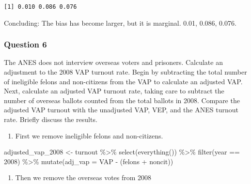 \documentclass[
  letterpaper,
  DIV=11,
  numbers=noendperiod]{scrartcl}
\newenvironment{Shaded}{\begin{snugshade}}{\end{snugshade}}
\newcommand{\AttributeTok}[1]{\textcolor[rgb]{0.40,0.45,0.13}{#1}}
\newcommand{\DecValTok}[1]{\textcolor[rgb]{0.68,0.00,0.00}{#1}}
\newcommand{\FunctionTok}[1]{\textcolor[rgb]{0.28,0.35,0.67}{#1}}
\newcommand{\NormalTok}[1]{\textcolor[rgb]{0.00,0.23,0.31}{#1}}
\newcommand{\OtherTok}[1]{\textcolor[rgb]{0.00,0.23,0.31}{#1}}
\newcommand{\SpecialCharTok}[1]{\textcolor[rgb]{0.37,0.37,0.37}{#1}}
\providecommand{\tightlist}{%
  \setlength{\itemsep}{0pt}\setlength{\parskip}{0pt}}\usepackage{longtable,booktabs,array}
\begin{document}
\begin{verbatim}
[1] 0.010 0.086 0.076
\end{verbatim}

Concluding: The bias has become larger, but it is marginal. 0.01, 0.086,
0.076.

\subsubsection{Question 6}\label{question-6}

The ANES does not interview overseas voters and prisoners. Calculate an
adjustment to the 2008 VAP turnout rate. Begin by subtracting the total
number of ineligible felons and non-citizens from the VAP to calculate
an adjusted VAP. Next, calculate an adjusted VAP turnout rate, taking
care to subtract the number of overseas ballots counted from the total
ballots in 2008. Compare the adjusted VAP turnout with the unadjusted
VAP, VEP, and the ANES turnout rate. Briefly discuss the results.

\begin{enumerate}
\def\labelenumi{\arabic{enumi}.}
\tightlist
\item
  First we remove ineligible felons and non-citizens.
\end{enumerate}

\begin{Shaded}
\begin{Highlighting}[]
\NormalTok{adjusted\_vap\_2008 }\OtherTok{\textless{}{-}}\NormalTok{ turnout }\SpecialCharTok{\%\textgreater{}\%} 
  \FunctionTok{select}\NormalTok{(}\FunctionTok{everything}\NormalTok{()) }\SpecialCharTok{\%\textgreater{}\%} 
  \FunctionTok{filter}\NormalTok{(year }\SpecialCharTok{==} \DecValTok{2008}\NormalTok{) }\SpecialCharTok{\%\textgreater{}\%} 
  \FunctionTok{mutate}\NormalTok{(}\AttributeTok{adj\_vap =}\NormalTok{ VAP }\SpecialCharTok{{-}}\NormalTok{ (felons }\SpecialCharTok{+}\NormalTok{ noncit))}
\end{Highlighting}
\end{Shaded}

\begin{enumerate}
\def\labelenumi{\arabic{enumi}.}
\setcounter{enumi}{1}
\tightlist
\item
  Then we remove the overseas votes from 2008
\end{enumerate}
\end{document}
